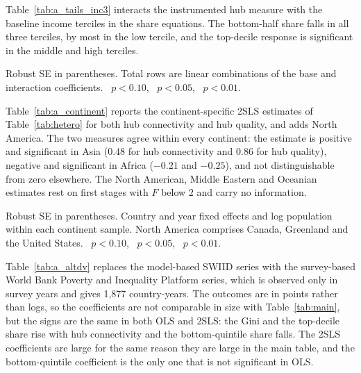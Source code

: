 Table~\ref{tab:a_tails_inc3} interacts the instrumented hub measure with the baseline income terciles in the share equations. The bottom-half share falls in all three terciles, by most in the low tercile, and the top-decile response is significant in the middle and high terciles.

\begin{table}[H]\centering\caption{Distributional location by baseline income tercile (interaction 2SLS, Feyrer instrument).}\label{tab:a_tails_inc3}
\begin{threeparttable}\small
\begin{tablenotes}\footnotesize\item Robust SE in parentheses. Total rows are linear combinations of the base and interaction coefficients. \sym{*}~$p<0.10$, \sym{**}~$p<0.05$, \sym{***}~$p<0.01$.\end{tablenotes}\end{threeparttable}\end{table}


Table~\ref{tab:a_continent} reports the continent-specific 2SLS estimates of Table~\ref{tab:hetero} for both hub connectivity and hub quality, and adds North America. The two measures agree within every continent: the estimate is positive and significant in Asia ($0.48$ for hub connectivity and $0.86$ for hub quality), negative and significant in Africa ($-0.21$ and $-0.25$), and not distinguishable from zero elsewhere. The North American, Middle Eastern and Oceanian estimates rest on first stages with $F$ below $2$ and carry no information.

\begin{table}[H]\centering\caption{Continent-specific 2SLS, both connectivity measures (Feyrer instrument).}\label{tab:a_continent}
\begin{threeparttable}\small
\begin{tablenotes}\footnotesize\item Robust SE in parentheses. Country and year fixed effects and log population within each continent sample. North America comprises Canada, Greenland and the United States. \sym{*}~$p<0.10$, \sym{**}~$p<0.05$, \sym{***}~$p<0.01$.\end{tablenotes}\end{threeparttable}\end{table}

Table~\ref{tab:a_altdv} replaces the model-based SWIID series with the survey-based World Bank Poverty and Inequality Platform series, which is observed only in survey years and gives 1,877 country-years. The outcomes are in points rather than logs, so the coefficients are not comparable in size with Table~\ref{tab:main}, but the signs are the same in both OLS and 2SLS: the Gini and the top-decile share rise with hub connectivity and the bottom-quintile share falls. The 2SLS coefficients are large for the same reason they are large in the main table, and the bottom-quintile coefficient is the only one that is not significant in OLS.

